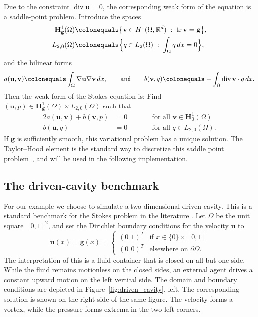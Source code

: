\documentclass[a4paper,10pt,headings=normal,bibliography=totoc]{scrartcl}
\newcommand{\R}{\mathbb{R}}
\renewcommand{\div}{\operatorname{div}}
\begin{document}
Due to the constraint $\div \mathbf{u} = 0$, the corresponding weak form of the equation is a saddle-point problem.
Introduce the spaces
\begin{align*}
  \mathbf{H}^1_{\mathbf{g}}(\Omega)
      & \colonequals
      \big\{ \mathbf{v} \in H^1(\Omega,\R^d) \; :\; \operatorname{tr}{\mathbf{v}} = \mathbf{g} \big\}, \\
 L_{2,0}(\Omega) & \colonequals  \Big\{ q \in L_2(\Omega) \; :\; \int_\Omega q\,dx = 0 \Big\},
\end{align*}
and the bilinear forms
\begin{equation*}
 a(\mathbf{u},\mathbf{v}) \colonequals \int_\Omega \nabla \mathbf{u} \nabla \mathbf{v} \,dx,
 \qquad \text{and} \qquad
 b(\mathbf{v},q) \colonequals -\int_\Omega \div \mathbf{v} \cdot q \,dx.
\end{equation*}
Then the weak form of the Stokes equation is: Find $(\mathbf{u},p) \in \mathbf{H}_{\mathbf{g}}^1(\Omega) \times L_{2,0}(\Omega)$ such that
\begin{alignat*}{2}
 a(\mathbf{u},\mathbf{v}) + b(\mathbf{v},p) & = 0 & \qquad & \text{for all $\mathbf{v} \in \mathbf{H}_0^1(\Omega)$} \\
 b(\mathbf{u},q)\qquad\qquad & = 0       &        & \text{for all $q \in L_{2,0}(\Omega)$}.
\end{alignat*}
If $\mathbf{g}$ is sufficiently smooth, this variational problem has a unique solution.
The Taylor--Hood element is the standard way to discretize this saddle point problem~\cite{braess:2013},
and will be used in the following implementation.

\subsection{The driven-cavity benchmark}

For our example we choose to simulate a two-dimensional driven-cavity.  This is a standard benchmark
for the Stokes problem in the literature \cite{schreiber1983driven}.
Let $\Omega$ be the unit square $[0,1]^2$, and set the Dirichlet
boundary conditions for the velocity $\mathbf{u}$ to
\begin{equation*}
 \mathbf{u}(x)
 =\mathbf{g}(x)
 =
 \begin{cases}
  (0,1)^T & \text{if $x \in \{0\} \times [0,1]$} \\
  (0,0)^T & \text{elsewhere on $\partial \Omega$}.
 \end{cases}
\end{equation*}
The interpretation of this is a fluid container that is closed on all but one side.  While the fluid remains
motionless on the closed sides, an external agent drives a constant upward motion on the left vertical side.
The domain and boundary conditions are depicted in Figure~\ref{fig:driven_cavity}, left.
The corresponding solution is shown on the right side of the same figure.  The velocity forms a vortex,
while the pressure forms extrema in the two left corners.
\end{document}
